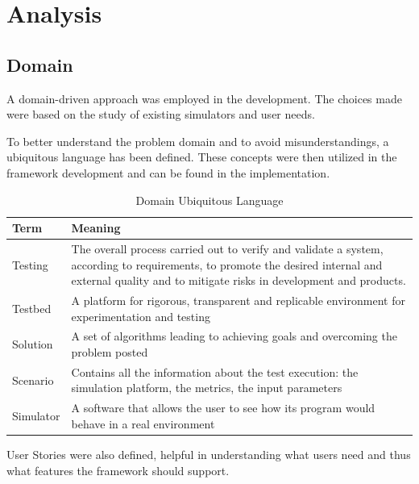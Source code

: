 \documentclass[12pt,a4paper,openright,twoside]{book}
\begin{document}
\chapter{Analysis}

\section{Domain}

A domain-driven approach was employed in the development. The choices made were based on the study of existing simulators and user needs. 

To better understand the problem domain and to avoid misunderstandings, a ubiquitous language has been defined.
These concepts were then utilized in the framework development and can be found in the implementation.

\begin{table}[H]
    \centering
    \begin{tabular}{|l|p{}|}
    \toprule
    \textbf{Term} & \textbf{Meaning} \\
    \midrule                                                                                                                                                              
    Testing & The overall process carried out to verify and validate a system, according to requirements, to promote the desired internal and external quality and to mitigate risks in development and products. \\ \hline
    Testbed & A platform for rigorous, transparent and replicable environment for experimentation and testing \\ \hline
    Solution & A set of algorithms leading to achieving goals and overcoming the problem posted \\ \hline
    Scenario & Contains all the information about the test execution: the simulation platform, the metrics, the input parameters \\ \hline
    Simulator & A software that allows the user to see how its program would behave in a real environment \\ \hline
    \end{tabular}
    \caption{Domain Ubiquitous Language}
    \end{table}

User Stories were also defined, helpful in understanding what users need and thus what features the framework should support.
\end{document}
